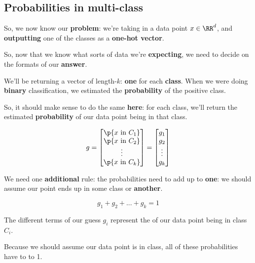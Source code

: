     \subsection*{Probabilities in multi-class}
    
        So, we now know our \textbf{problem}: we're taking in a data point $x \in \RR^d$, and \textbf{outputting} one of the classes as a \textbf{one-hot vector}.
        
        So, now that we know what sorts of data we're \textbf{expecting}, we need to decide on the formats of our \textbf{answer}.
        
        We'll be returning a vector of length-$k$: \textbf{one} for each \textbf{class}. When we were doing \textbf{binary} classification, we estimated the \textbf{probability} of the positive class.
        
        So, it should make sense to do the same \textbf{here}: for each class, we'll return the estimated \textbf{probability} of our data point being in that class.
        
        \begin{equation}
            g
            =
            \begin{bmatrix}
              \p{x \text{ in } C_1} \\ 
              \p{x \text{ in } C_2} \\ 
              \vdots \\ 
              \p{x \text{ in } C_k} 
            \end{bmatrix}
            =
            \begin{bmatrix}
              g_1\\g_2\\\vdots\\g_k
            \end{bmatrix}
        \end{equation}
        
        We need one \textbf{additional} rule: the probabilities need to add up to \textbf{one}: we should assume our point ends up in some class or \textbf{another}.
        
        \begin{equation}
            g_1+g_2+...+g_k=1
        \end{equation}
        
        \begin{concept}
            The different terms of our  guess $g_i$ represent the  of our data point being in class $C_i$.
            
            Because we should assume our data point is in  class, all of these probabilities have to  to 1.
        \end{concept}

